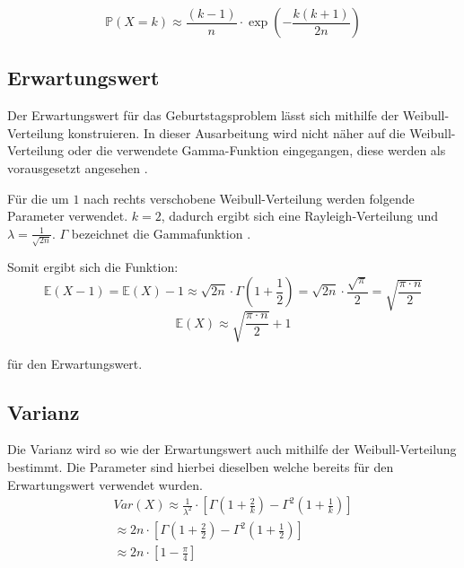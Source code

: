 \documentclass[../main.tex]{subfiles}
\begin{document}
\begin{flushleft}
\begin{equation}
\mathbb{P}(X = k) \approx \frac{ (k-1) }{ n } \cdot \exp( - \frac{ k (k + 1) }{ 2n } )
\end{equation}

 \subsection{Erwartungswert}

Der Erwartungswert für das Geburtstagsproblem lässt sich mithilfe der Weibull-Verteilung konstruieren. In dieser Ausarbeitung wird nicht näher auf die Weibull-Verteilung oder die verwendete Gamma-Funktion eingegangen, diese werden als vorausgesetzt angesehen \cite{rinne}.  \newline

Für die um $1$ nach rechts verschobene Weibull-Verteilung werden folgende Parameter verwendet. $k = 2$, dadurch ergibt sich eine Rayleigh-Verteilung und $\lambda = \frac{ 1 }{ \sqrt{2n} }$.
$\Gamma$ bezeichnet die Gammafunktion \cite{rinne}. \newline

Somit ergibt sich die Funktion:
\begin{equation}
\mathbb{E}(X - 1) = \mathbb{E}(X) - 1 \approx \sqrt{ 2n } \cdot \Gamma (1 + \frac{ 1 }{ 2 } ) = \sqrt{ 2n } \cdot \frac{ \sqrt{ \pi } }{ 2 } = \sqrt{ \frac{ \pi \cdot n }{ 2 } }
\end{equation}
\begin{equation}
\mathbb{E}(X) \approx \sqrt{ \frac{ \pi \cdot n }{ 2 } } + 1
\end{equation}

für den Erwartungswert.

 \subsection{Varianz}

Die Varianz wird so wie der Erwartungswert auch mithilfe der Weibull-Verteilung bestimmt. Die Parameter sind hierbei dieselben welche bereits für den Erwartungswert verwendet wurden\cite{rinne}.
\begin{eqnarray}
Var(X) \approx \frac{ 1 }{ \lambda^{ 2 } } \cdot [\Gamma (1+\frac{ 2 }{ k }) - \Gamma^{ 2 }(1+\frac{ 1 }{ k } )]   \label{eq:08}\\
\approx 2n \cdot [\Gamma(1+\frac{ 2 }{ 2 }) - \Gamma^{ 2 }(1+\frac{ 1 }{ 2 } )] \\
\approx 2n \cdot [1 - \frac{ \pi }{ 4 }]
\end{eqnarray}


\end{flushleft}
\end{document}
